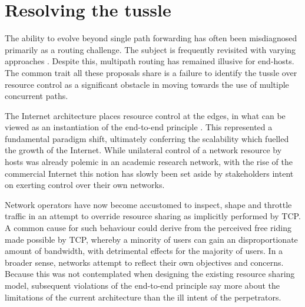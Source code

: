 \section{Resolving the tussle}

The ability to evolve beyond single path forwarding has often been misdiagnosed primarily as a routing challenge. 
The subject is frequently revisited with varying approaches \cite{Sunshine:1977p152,Yang:2003p136,Yang:2006p405,Godfrey:2009p36}. 
Despite this, multipath routing has remained illusive for end-hosts. 
The common trait all these proposals share is a failure to identify the tussle over resource control as a significant obstacle in moving towards the use of multiple concurrent paths.

The Internet architecture places resource control at the edges, in what can be viewed as an instantiation of the end-to-end principle \cite{Saltzer:1984p305}. 
This represented a fundamental paradigm shift, ultimately conferring the scalability which fuelled the growth of the Internet.  
While unilateral control of a network resource by hosts was already polemic in an academic research network, with the rise of the commercial Internet this notion has slowly been set aside by stakeholders intent on exerting control over their own networks.

Network operators have now become accustomed to inspect, shape and throttle traffic in an attempt to override resource sharing as implicitly performed by \ac{TCP}. 
A common cause for such behaviour could derive from the perceived free riding made possible by \ac{TCP}, whereby a minority of users can gain an disproportionate amount of bandwidth, with detrimental effects for the majority of users. 
In a broader sense, networks attempt to reflect their own objectives and concerns. 
Because this was not contemplated when designing the existing resource sharing model, subsequent violations of the end-to-end principle say more about the limitations of the current architecture than the ill intent of the perpetrators. 

